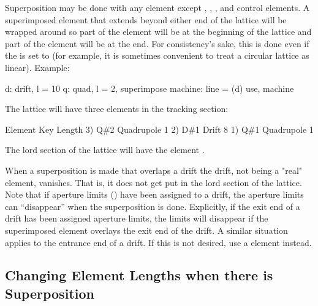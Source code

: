 Superposition may be done with any element except ,
, , and  control elements. A
superimposed element that extends beyond either end of the lattice
will be wrapped around so part of the element will be at the beginning
of the lattice and part of the element will be at the end. For
consistency's sake, this is done even if the  is set
to  (for example, it is sometimes convenient to
treat a circular lattice as linear). Example:
\begin{example}
  d: drift, l = 10
  q: quad, l = 2, superimpose
  machine: line = (d)
  use, machine
\end{example}
The lattice will have three elements in the tracking section:
\begin{example}
        Element   Key           Length
  3)    Q{\#}2       Quadrupole    1
  2)    D{\#}1       Drift         8
  1)    Q{\#}1       Quadrupole    1
\end{example}
The lord section of the lattice will have the element . 

When a superposition is made that overlaps a drift the drift, not
being a "real" element, vanishes. That is, it does not get put in the
lord section of the lattice.  Note that if aperture limits
() have been assigned to a drift, the aperture limits
can ``disappear'' when the superposition is done. Explicitly, if the
exit end of a drift has been assigned aperture limits, the limits will
disappear if the superimposed element overlays the exit end of the
drift. A similar situation applies to the entrance end of a drift. If
this is not desired, use a  element instead.

\subsection{Changing Element Lengths when there is Superposition}
\label{s:super.length}

